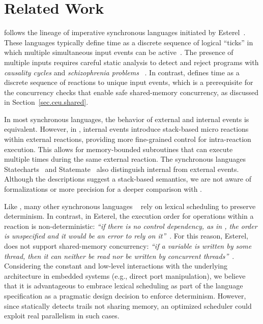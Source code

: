 \section{Related Work}
\label{sec.related}

\CEU follows the lineage of imperative synchronous languages initiated by
Esterel~\cite{esterel.ieee91}.
These languages typically define time as a discrete sequence of logical
``ticks'' in which multiple simultaneous input events can be
active~\cite{ceu.tecs17}.
%
The presence of multiple inputs requires careful static analysis to detect and
reject programs with \emph{causality cycles} and \emph{schizophrenia problems}%
~\cite{esterel.constructive}.
%
In contrast, \CEU defines time as a discrete sequence of reactions to
unique input events, which is a prerequisite for the concurrency checks that
enable safe shared-memory concurrency, as discussed in
Section~\ref{sec.ceu.shared}.

In most synchronous languages, the behavior of external and internal events is
equivalent.
However, in \CEU, internal events introduce stack-based micro reactions within
external reactions, providing more fine-grained control for intra-reaction
execution.
%
This allows for memory-bounded subroutines that can execute multiple times
during the same external reaction.
%
The synchronous languages Statecharts~\cite{statecharts.variants} and
Statemate~\cite{statecharts.statemate} also distinguish internal from external
events.
Although the descriptions suggest a stack-based semantics, we are not aware of
formalizations or more precision for a deeper comparison with \CEU.

Like \CEU, many other synchronous languages%
~\cite{rp.rc,wsn.protothreads,wsn.sol,rp.synchc,rp.pretc}
rely on lexical scheduling to preserve determinism.
%
In contrast, in Esterel, the execution order for operations within a reaction
is non-deterministic: \emph{``if there is no control dependency, as in
{\scriptsize{}},
the order is unspecified and it would be an error to rely on
it''}~\cite{esterel.primer}.
%
For this reason, Esterel, does not support shared-memory concurrency:
\emph{``if a variable is written by some thread, then it can neither be read
nor be written by concurrent threads''}~\cite{esterel.primer}.
%
Considering the constant and low-level interactions with the underlying
architecture in embedded systems (e.g., direct port manipulation), we believe
that it is advantageous to embrace lexical scheduling as part of the language
specification as a pragmatic design decision to enforce determinism.
%
However, since \CEU statically detects trails not sharing memory, an optimized
scheduler could exploit real parallelism in such cases.


